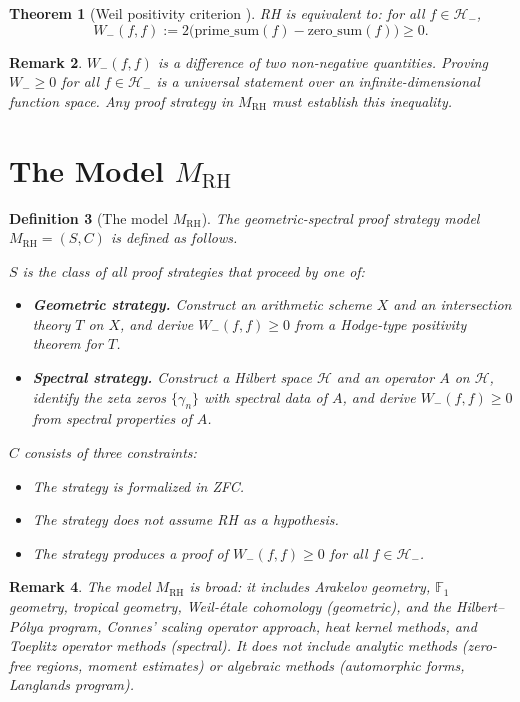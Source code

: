 \documentclass[12pt]{article}
\newtheorem{theorem}{Theorem}[section]
\newtheorem{definition}[theorem]{Definition}
\newtheorem{remark}[theorem]{Remark}
\newcommand{\FF}{\mathbb{F}}
\newcommand{\Hminus}{\mathcal{H}_-}
\newcommand{\MRH}{M_{\mathrm{RH}}}
\begin{document}
\begin{theorem}[Weil positivity criterion \cite{weil1952}]
\label{thm:weil}
RH is equivalent to: for all $f \in \Hminus$,
\[
W_-(f,f) := 2\bigl(\mathrm{prime\_sum}(f) - \mathrm{zero\_sum}(f)\bigr)
\geq 0.
\]
\end{theorem}

\begin{remark}
$W_-(f,f)$ is a difference of two non-negative quantities. Proving
$W_- \geq 0$ for all $f \in \Hminus$ is a universal statement over
an infinite-dimensional function space. Any proof strategy in $\MRH$
must establish this inequality.
\end{remark}

\section{The Model \texorpdfstring{$\MRH$}{M\_RH}}
\label{sec:model}

\begin{definition}[The model $\MRH$]
\label{def:model}
The \emph{geometric-spectral proof strategy model} $\MRH = (S, C)$
is defined as follows.

$S$ is the class of all proof strategies that proceed by one of:
\begin{itemize}
\item[\textup{(G)}] \textbf{Geometric strategy.} Construct an
  arithmetic scheme $X$ and an intersection theory $T$ on $X$,
  and derive $W_-(f,f) \geq 0$ from a Hodge-type positivity theorem
  for $T$.
\item[\textup{(S)}] \textbf{Spectral strategy.} Construct a Hilbert
  space $\mathcal{H}$ and an operator $A$ on $\mathcal{H}$, identify
  the zeta zeros $\{\gamma_n\}$ with spectral data of $A$, and derive
  $W_-(f,f) \geq 0$ from spectral properties of $A$.
\end{itemize}

$C$ consists of three constraints:
\begin{itemize}
\item[\textup{(C1)}] The strategy is formalized in ZFC.
\item[\textup{(C2)}] The strategy does not assume RH as a hypothesis.
\item[\textup{(C3)}] The strategy produces a proof of $W_-(f,f) \geq 0$
  for all $f \in \Hminus$.
\end{itemize}
\end{definition}

\begin{remark}
The model $\MRH$ is broad: it includes Arakelov geometry, $\FF_1$
geometry, tropical geometry, Weil-\'etale cohomology (geometric),
and the Hilbert--P\'olya program, Connes' scaling operator approach,
heat kernel methods, and Toeplitz operator methods (spectral). It
does not include analytic methods (zero-free regions, moment estimates)
or algebraic methods (automorphic forms, Langlands program).
\end{remark}
\end{document}
